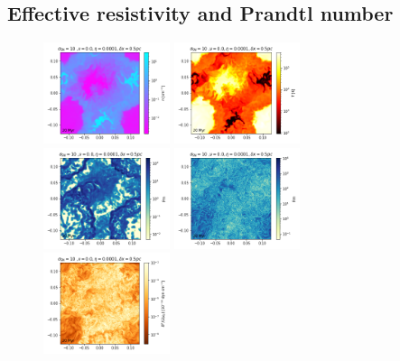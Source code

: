 \documentclass[preprint2]{aastex63}
\begin{document}
\subsection{{Effective resistivity and Prandtl number}} \label{sec:eta}
\begin{figure}
\centering
\includegraphics[trim=0.0cm 0.00cm 0.0cm 0.0cm,clip=true,width=0.33\textwidth]{csc_figs/rho05pcPm0e-4_02.png}
\includegraphics[trim=0.0cm 0.00cm 0.0cm 0.0cm,clip=true,width=0.33\textwidth]{csc_figs/tt05pcPm0e-4_02.png}
\includegraphics[trim=0.0cm 0.00cm 0.0cm 0.0cm,clip=true,width=0.33\textwidth]{csc_figs/Pm05pcPm0e-4_02.png}
\includegraphics[trim=0.0cm 0.00cm 0.0cm 0.0cm,clip=true,width=0.33\textwidth]{csc_figs/Rm05pcPm0e-4_02.png}
\includegraphics[trim=0.0cm 0.00cm 0.0cm 0.0cm,clip=true,width=0.33\textwidth]{csc_figs/pb05pcPm0e-4_02.png}

\end{figure}
\end{document}
